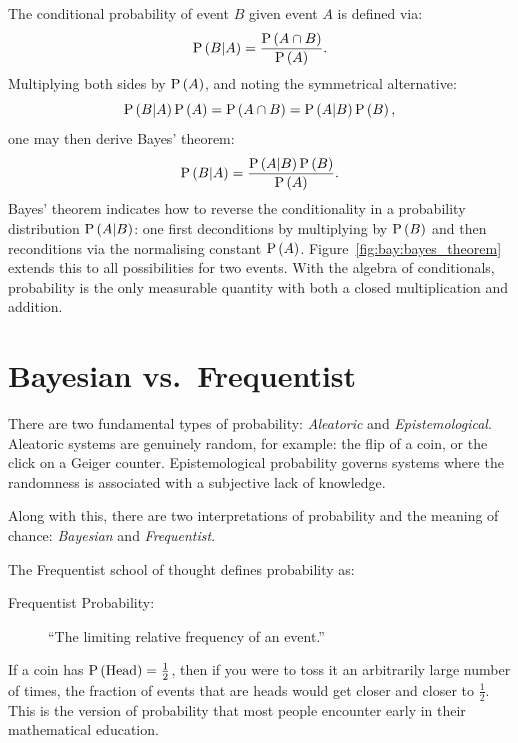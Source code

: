 The conditional probability of event \(B\) given event \(A\) is defined via:
\begin{equation}
  \mathrm{P}\left(B\middle|A\right) = \frac{\mathrm{P}\left(A\cap B\right)}{\mathrm{P}\left(A\right)}.
  \label{eqn:bay:cond}
\end{equation}
Multiplying both sides by \(\mathrm{P}\left(A\right)\), and noting the symmetrical alternative:
\begin{equation}
  \mathrm{P}\left(B\middle|A\right)\mathrm{P}\left(A\right) = \mathrm{P}\left(A\cap B\right) = \mathrm{P}\left(A\middle|B\right)\mathrm{P}\left(B\right),
  \label{eqn:bay:sym}
\end{equation}
one may then derive Bayes' theorem:
\begin{equation}
  \mathrm{P}\left(B\middle|A\right) = \frac{\mathrm{P}\left(A\middle|B\right)\mathrm{P}\left(B\right)}{\mathrm{P}\left(A\right)}.
  \label{eqn:bay:bayes}
\end{equation}
Bayes' theorem indicates how to reverse the conditionality in a probability distribution \(\mathrm{P}\left(A\middle|B\right)\): one first deconditions by multiplying by \(\mathrm{P}\left(B\right)\) and then reconditions via the normalising constant \(\mathrm{P}\left(A\right)\). Figure~\ref{fig:bay:bayes_theorem} extends this to all possibilities for two events.
With the algebra of conditionals, probability is the only measurable quantity with both a closed multiplication and addition.

\section{Bayesian vs.\ Frequentist}
\label{sec:bay:bayesian_frequentist}

There are two fundamental types of probability: {\em Aleatoric\/} and {\em Epistemological}. Aleatoric systems are genuinely random, for example: the flip of a coin, or the click on a Geiger counter. Epistemological probability governs systems where the randomness is associated with a subjective lack of knowledge. 

Along with this, there are two interpretations of probability and the meaning of chance: {\em Bayesian\/} and {\em Frequentist}.

The Frequentist school of thought defines probability as:
\begin{description}
  \item[Frequentist Probability:]``The limiting relative frequency of an event.''
\end{description}
If a coin has \(\mathrm{P}\left(\mathrm{Head}\right)=\frac{1}{2}\), then if you were to toss it an arbitrarily large number of times, the fraction of events that are heads would get closer and closer to \(\frac{1}{2}\). This is the version of probability that most people encounter early in their mathematical education. 

